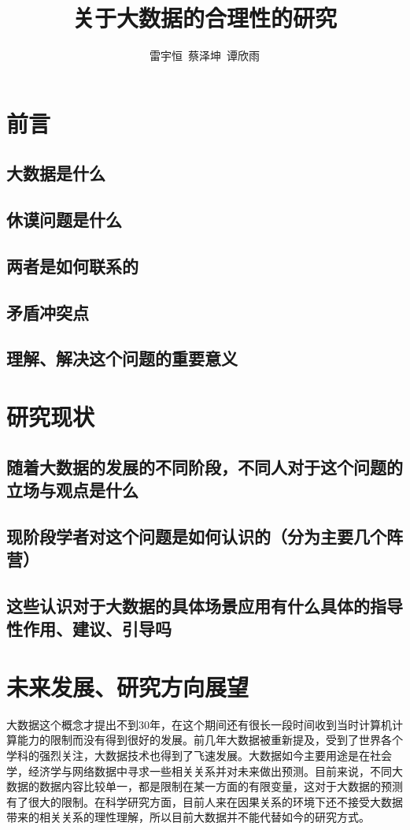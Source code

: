 \documentclass{ctexart}
\title{关于大数据的合理性的研究}
\author{雷宇恒\ 蔡泽坤\ 谭欣雨}
\date{}
\begin{document}
    \maketitle

\section{前言}
\subsection{大数据是什么}
\subsection{休谟问题是什么}
\subsection{两者是如何联系的}
\subsection{矛盾冲突点}
\subsection{理解、解决这个问题的重要意义}

\section{研究现状}
\subsection{随着大数据的发展的不同阶段，不同人对于这个问题的立场与观点是什么}
\subsection{现阶段学者对这个问题是如何认识的（分为主要几个阵营）}
\subsection{这些认识对于大数据的具体场景应用有什么具体的指导性作用、建议、引导吗}

\section{未来发展、研究方向展望}

大数据这个概念才提出不到30年，在这个期间还有很长一段时间收到当时计算机计算能力的限制而没有得到很好的发展。前几年大数据被重新提及，受到了世界各个学科的强烈关注，大数据技术也得到了飞速发展。大数据如今主要用途是在社会学，经济学与网络数据中寻求一些相关关系并对未来做出预测。目前来说，不同大数据的数据内容比较单一，都是限制在某一方面的有限变量，这对于大数据的预测有了很大的限制。在科学研究方面，目前人来在因果关系的环境下还不接受大数据带来的相关关系的理性理解，所以目前大数据并不能代替如今的研究方式。
\end{document}
